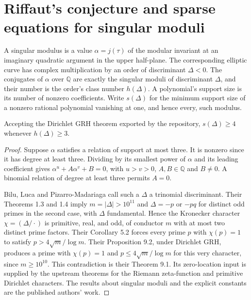 \section{Riffaut's conjecture and sparse equations for singular moduli}

A singular modulus is a value $\alpha=j(\tau)$ of the modular invariant at
an imaginary quadratic argument in the upper half-plane. The corresponding
elliptic curve has complex multiplication by an order of discriminant
$\Delta<0$. The conjugates of $\alpha$ over $\mathbb Q$ are exactly the
singular moduli of discriminant $\Delta$, and their number is the order's
class number $h(\Delta)$. A polynomial's support size is its number of
nonzero coefficients. Write $s(\Delta)$ for the minimum support size of a
nonzero rational polynomial vanishing at one, and hence every, such modulus.

\begin{theorem}
Accepting the Dirichlet GRH theorem exported by the repository,
$s(\Delta)\ge4$ whenever $h(\Delta)\ge3$.
\end{theorem}
\begin{proof}
Suppose $\alpha$ satisfies a relation of support at most three.
It is nonzero since it has degree at least three. Dividing by its smallest
power of $\alpha$ and its leading coefficient gives
$\alpha^u+A\alpha^v+B=0$, with $u>v>0$, $A,B\in\mathbb Q$ and
$B\ne0$. A binomial relation of degree at least three permits $A=0$.

Bilu, Luca and Pizarro-Madariaga call such a $\Delta$ a trinomial
discriminant. Their Theorems 1.3 and 1.4 imply
$m=|\Delta|>10^{11}$ and $\Delta=-p$ or $-pq$ for distinct odd primes
in the second case, with $\Delta$ fundamental. Hence the Kronecker character
$\chi=(\Delta/\cdot)$ is primitive, real, and odd, of conductor $m$ with at
most two distinct prime factors. Their Corollary 5.2 forces every prime $p$
with $\chi(p)=1$ to satisfy $p>4\sqrt m/\log m$. Their Proposition 9.2,
under Dirichlet GRH, produces a prime with $\chi(p)=1$ and
$p\le4\sqrt m/\log m$ for this very character, since $m\ge10^{10}$.
This contradiction is their Theorem 9.1. Its zero-location input is supplied
by the upstream theorems for the Riemann zeta-function and primitive Dirichlet
characters. The results about singular moduli and the explicit constants
are the published authors' work.
\end{proof}

